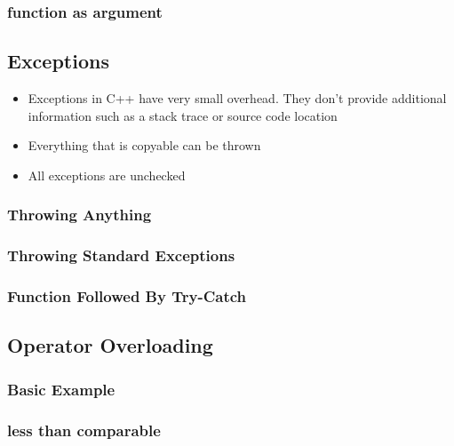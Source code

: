     \subsubsection{function as argument}

  \newpage
  \subsection{Exceptions}
    \begin{itemize}
      \item Exceptions in C++ have very small overhead. They don't provide additional
            information such as a stack trace or source code location
      \item Everything that is copyable can be thrown
      \item All exceptions are unchecked
    \end{itemize}

    \subsubsection{Throwing Anything}

    \subsubsection{Throwing Standard Exceptions}

    \subsubsection{Function Followed By Try-Catch}

  \newpage
  \subsection{Operator Overloading}
    \subsubsection{Basic Example}

    \subsubsection{less than comparable}

